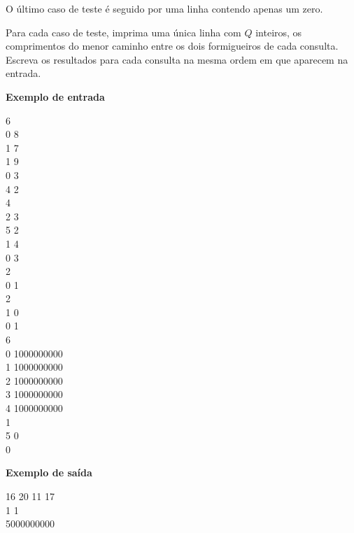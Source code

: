 \begin{mdframed}[backgroundcolor=blue!5]
O último caso de teste é seguido por uma linha contendo apenas um zero.

\vspace{0.2cm}

Para cada caso de teste, imprima uma única linha com $Q$ inteiros, os comprimentos do menor caminho entre os dois formigueiros de cada consulta. Escreva os resultados para cada consulta na mesma ordem em que aparecem na entrada.

\vspace{0.75cm}

\begin{minipage}{.4\linewidth}
    {\large{\textbf{Exemplo de entrada}}}\vspace{0.2cm}
    \begin{mdframed}[backgroundcolor=gray!10]
        \vspace{-0.5cm}
        6\\
        0 8\\
        1 7\\
        1 9\\
        0 3\\
        4 2\\
        4\\
        2 3\\
        5 2\\
        1 4\\
        0 3\\
        2\\
        0 1\\
        2\\
        1 0\\
        0 1\\
        6 \\
        0 1000000000\\
        1 1000000000\\
        2 1000000000\\
        3 1000000000\\
        4 1000000000\\
        1\\
        5 0\\
        0
        \vspace{-0.4cm}
    \end{mdframed}
\end{minipage}
\hspace{2cm}
\begin{minipage}{.4\linewidth}
    \vspace{-11.25cm}
    {\large{\textbf{Exemplo de saída}}}\vspace{0.2cm}
    \begin{mdframed}[backgroundcolor=gray!10]
        \vspace{-0.5cm}
        16 20 11 17\\
        1 1\\
        5000000000
        \vspace{-0.4cm}
    \end{mdframed}
\end{minipage}%


\end{mdframed}
